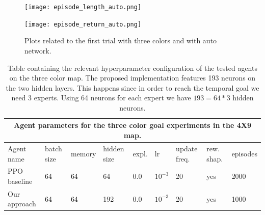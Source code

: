\documentclass{article}
\begin{document}
\begin{figure}[H]
  \centering
  \begin{minipage}[b]{0.45\textwidth}
    \texttt{[image: episode\_length\_auto.png]}
  \end{minipage}
  \hfill
  \begin{minipage}[b]{0.45\textwidth}
    \texttt{[image: episode\_return\_auto.png]}
  \end{minipage}
  \caption{Plots related to the first trial with three colors and with auto network.}
  \label{fig:threeColorsPlotsAuto}
\end{figure}





\begin{table}[h]
\begin{tabular}{|p{2.3cm} |p{1.8cm}|p{1.5cm}|p{1.5cm}|p{}|p{0.6cm}|p{1cm}|p{1.1cm}| p{1.1cm}|  }
 \hline
 \multicolumn{9}{|c|}{Agent parameters for the three color goal experiments in the 4X9 map.} \\
 \hline
 Agent name & batch size & memory & hidden size & expl. & lr & update freq. &rew. shap. & episodes \\
 \hline
 PPO baseline & 64 & 64 & 64 & 0.0 & $10^{-3}$ & 20 & yes & 2000  \\
\hline
\hline
 Our approach & 64 & 64 & 192 & 0.0 & $10^{-3}$ & 20&  yes &1000 \\
\hline
\end{tabular}
\caption{Table containing the relevant hyperparameter configuration of the tested agents on the three color map. The proposed implementation features 193 neurons on the two hidden layers. This happens since in order to reach the temporal goal we need 3 experts. Using 64 neurons for each expert we have \(193 = 64*3\) hidden neurons.}
\label{tab:threeColorMapAgentTable}
\end{table}
\end{document}
